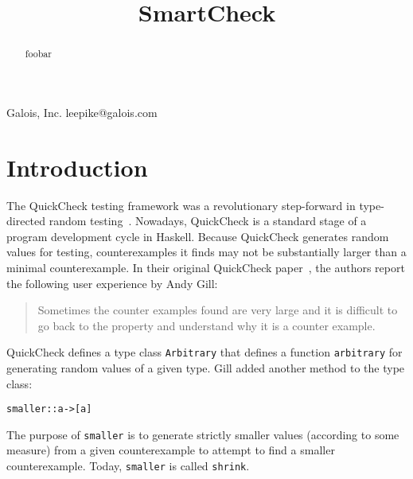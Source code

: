 \documentclass[9pt]{sigplanconf}
\newenvironment{code}{\begin{alltt}\footnotesize}{\end{alltt}}
\newcommand{\ttp}[1]{\texttt{#1}}
\begin{document}


\title{SmartCheck}

           {Galois, Inc.}
           {leepike@galois.com}
\maketitle

\begin{abstract}
foobar
\end{abstract}





\section{Introduction}\label{sec:intro}

The QuickCheck testing framework was a revolutionary step-forward in
type-directed random testing~\cite{qc}.  Nowadays, QuickCheck is a standard
stage of a program development cycle in Haskell.  Because QuickCheck generates
random values for testing, counterexamples it finds may not be substantially
larger than a minimal counterexample.  In their original QuickCheck
paper~\cite{qc}, the authors report the following user experience by Andy Gill:
%
\begin{quote}
Sometimes the counter examples found are very large and it is difficult to go
back to the property and understand why it is a counter example.
\end{quote}
%
\noindent
QuickCheck defines a type class \ttp{Arbitrary} that defines a function
\ttp{arbitrary} for generating random values of a given type.  Gill added another
method to the type class:
%
\begin{code}
smaller :: a -> [a] 
\end{code}
%
\noindent
The purpose of \ttp{smaller} is to generate strictly smaller values (according to
some measure) from a given counterexample to attempt to find a smaller
counterexample.  Today, \ttp{smaller} is called \ttp{shrink}.
\end{document}
